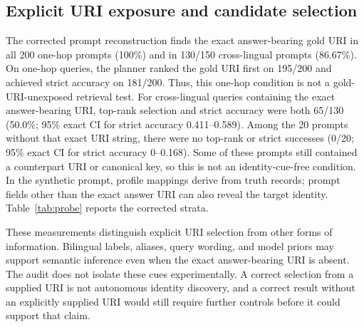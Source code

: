 \documentclass[a4paper,fleqn]{cas-dc}
\begin{document}
\begin{table}[t]
\centering\small

\caption{Primary 500-query results. Strict accuracy is the object-grounded measure in Eq.~(\ref{eq:strict}) with exact 95\% intervals. GSR is logical triple access. The vector and label-lookup rows are implementation-specific comparators.}
\label{tab:main}
\end{table}

\begin{table}[t]
\centering\small

\caption{Descriptive strict-success rates for the full planner and fixed-$k$ no-aligner baseline by query family, calculated on the same query identifiers. No subgroup significance tests are reported.}
\label{tab:family}
\end{table}

\subsection{Explicit URI exposure and candidate selection}
The corrected prompt reconstruction finds the exact answer-bearing gold URI in all 200 one-hop prompts (100\%) and in 130/150 cross-lingual prompts (86.67\%). On one-hop queries, the planner ranked the gold URI first on 195/200 and achieved strict accuracy on 181/200. Thus, this one-hop condition is not a gold-URI-unexposed retrieval test. For cross-lingual queries containing the exact answer-bearing URI, top-rank selection and strict accuracy were both 65/130 (50.0\%; 95\% exact CI for strict accuracy 0.411--0.589). Among the 20 prompts without that exact URI string, there were no top-rank or strict successes (0/20; 95\% exact CI for strict accuracy 0--0.168). Some of these prompts still contained a counterpart URI or canonical key, so this is not an identity-cue-free condition. In the synthetic prompt, profile mappings derive from truth records; prompt fields other than the exact answer URI can also reveal the target identity. Table~\ref{tab:probe} reports the corrected strata.

These measurements distinguish explicit URI selection from other forms of information. Bilingual labels, aliases, query wording, and model priors may support semantic inference even when the exact answer-bearing URI is absent. The audit does not isolate these cues experimentally. A correct selection from a supplied URI is not autonomous identity discovery, and a correct result without an explicitly supplied URI would still require further controls before it could support that claim.
\end{document}
